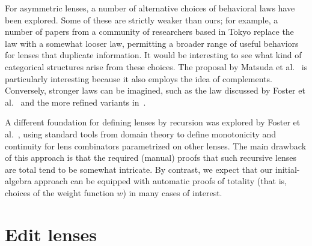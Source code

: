
For asymmetric lenses, a number of alternative \iffull choices of behavioral
\fi
laws
have been explored.  Some of these are \iffull strictly \fi weaker than ours; for
example, a number of papers from a community of researchers based in Tokyo
replace the  law with a somewhat looser  law,
permitting a broader range of useful behaviors for lenses that duplicate
information.  It would be interesting to see what kind of categorical
structures arise from these choices.  The proposal by Matsuda et
al.~\cite{matsuda2007btb} is particularly interesting because it also employs
the idea of complements.  Conversely, stronger laws can be imagined, such as
the  law discussed by Foster et
al.~\cite{Focal2005-shortcite}\iffull{} and the more refined variants
in~\cite{updatable-security-views}\fi\iflater{}\fi.

A different foundation for defining lenses by recursion was explored by
Foster et al.~\cite{Focal2005-shortcite}, using standard tools from domain
theory to define monotonicity and continuity for lens combinators
parametrized on other lenses.  The main drawback of this approach is that
the required (manual) proofs that such recursive lenses are total tend to be
somewhat intricate.  By contrast, we expect that our initial-algebra
approach can be equipped with automatic proofs of totality (that is, choices
of the weight function $w$) in many cases of interest.

\ifdelta
{}
\fi
\section{Edit lenses}
\newif \iffull  \fulltrue
\newif \ifspaceisnoissue  \spaceisnoissuefalse
\newif \ifdraft \drafttrue
\newif \ifanon  \anonfalse
\newif \iflater \laterfalse  %
\newif \iffailed \failedfalse %

